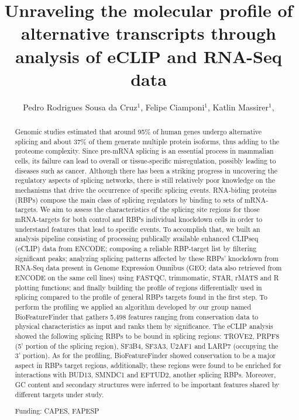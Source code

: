 \documentclass[twoside]{article}
\title{\vspace{-15mm}\fontsize{24pt}{10pt}\selectfont\textbf{ Unraveling the molecular profile of alternative transcripts through analysis of eCLIP and RNA-Seq data }} %
\author{ Pedro Rodrigues Sousa da Cruz$^{1}$, Felipe Ciamponi$^{1}$, Katlin Massirer$^{1}$, }
\affil{ 1 CBMEG - UNICAMP

 }
\date{}
\begin{document}
  
  
  \maketitle %
  
  
  \thispagestyle{fancy} %
  
  
  \begin{abstract}
  Genomic studies estimated that around 95\% of human genes undergo alternative splicing and about 37\% of them generate multiple protein isoforms, thus adding to the proteome complexity. Since pre-mRNA splicing is an essential process in mammalian cells, its failure can lead to overall or tissue-specific misregulation, possibly leading to diseases such as cancer. Although there has been a striking progress in uncovering the regulatory aspects of splicing networks, there is still relatively poor knowledge on the mechanisms that drive the occurrence of specific splicing events. RNA-biding proteins (RBPs) compose the main class of splicing regulators by binding to sets of mRNA-targets. We aim to assess the characteristics of the splicing site regions for those mRNA-targets for both control and RBPs individual knockdown cells in order to understand features that lead to specific events. To accomplish that, we built an analysis pipeline consisting of processing publically available enhanced CLIPseq (eCLIP) data from ENCODE; composing a reliable RBP-target list by filtering significant peaks; analyzing splicing patterns affected by these RBPs’ knockdown from RNA-Seq data present in Genome Expression Omnibus (GEO; data also retrieved from ENCODE on the same cell lines) using FASTQC, trimmomatic, STAR, rMATS and R plotting functions; and finally building the profile of regions differentially used in splicing compared to the profile of general RBPs targets found in the first step. To perform the profiling we applied an algorithm developed by our group named BioFeatureFinder that gathers 5,498 features ranging from conservation data to physical characteristics as input and ranks them by significance. The eCLIP analysis showed the following splicing RBPs to be bound in splicing regions: TROVE2, PRPF8 (5’ portion of the splicing region), SF3B4, SF3A3, U2AF1 and LARP7 (occupying the 3’ portion). As for the profiling, BioFeatureFinder showed conservation to be a major aspect in RBPs target regions, additionally, these regions were found to be enriched for interactions with BUD13, SMNDC1 and EFTUD2, another splicing RBPs. Moreover, GC content and secondary structures were inferred to be important features shared by different targets under study.
  
  Funding: CAPES, FAPESP \\ 
  \end{abstract}
  
\end{document}
